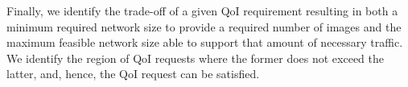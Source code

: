 Finally, we identify the trade-off of a given QoI requirement resulting in both a minimum required network size to provide a required number of images and the maximum feasible network size able to support that amount of necessary traffic.  We identify the region of QoI requests where the former does not exceed the latter, and, hence, the QoI request can be satisfied. 

